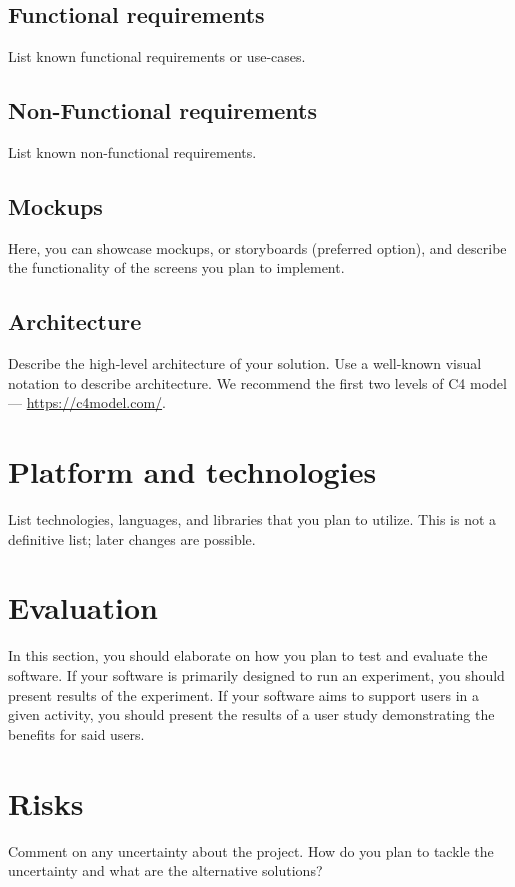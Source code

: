 \documentclass{article}
\begin{document}
\subsection{Functional requirements}
List known functional requirements or use-cases.

\subsection{Non-Functional requirements}
List known non-functional requirements.

\subsection{Mockups}
Here, you can showcase mockups, or storyboards (preferred option), and describe the functionality of the screens you plan to implement.

\subsection{Architecture}
Describe the high-level architecture of your solution.
Use a well-known visual notation to describe architecture.
We recommend the first two levels of C4 model --- \url{https://c4model.com/}.

\section{Platform and technologies}
List technologies, languages, and libraries that you plan to utilize.
This is not a definitive list; later changes are possible.

\section{Evaluation}
In this section, you should elaborate on how you plan to test and evaluate the software.
If your software is primarily designed to run an experiment, you should present results of the experiment.
If your software aims to support users in a given activity, you should present the results of a user study demonstrating the benefits for said users.

\section{Risks}
Comment on any uncertainty about the project.
How do you plan to tackle the uncertainty and what are the alternative solutions?
\end{document}

